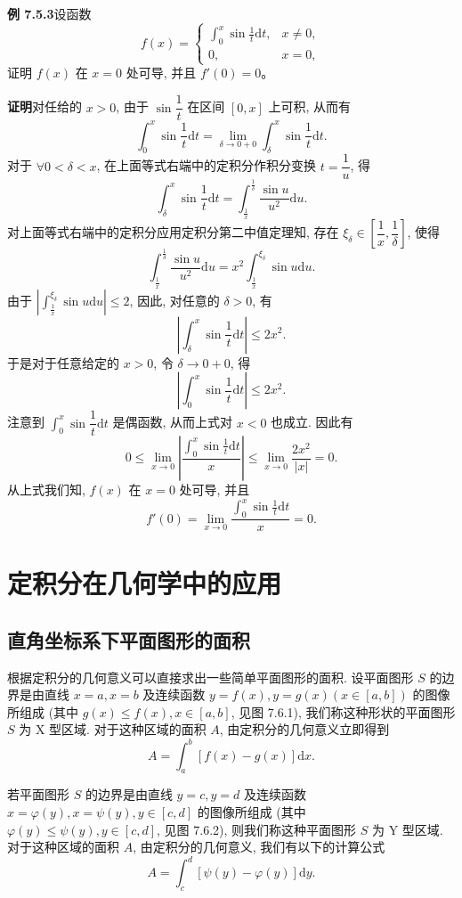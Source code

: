 \documentclass[UTF8, 12pt, fontset=fandol, oneside]{ctexart}
\begin{document}
\noindent\textbf{例 7.5.3}\quad 设函数
\[
  f(x)=
  \begin{cases}
    \displaystyle\int_0^x \sin\frac{1}{t}\mathrm dt, & x\neq0,\\
    0, & x=0,
  \end{cases}
\]
证明 $f(x)$ 在 $x=0$ 处可导, 并且 $f'(0)=0$。

\noindent\textbf{证明}\quad 对任给的 $x>0$, 由于 $\sin\dfrac{1}{t}$ 在区间 $[0,x]$ 上可积, 从而有
\[
  \int_0^x \sin\frac{1}{t}\mathrm dt=\lim_{\delta\to0+0}\int_\delta^x \sin\frac{1}{t}\mathrm dt.
\]
对于 $\forall 0<\delta<x$, 在上面等式右端中的定积分作积分变换 $t=\dfrac{1}{u}$, 得
\[
  \int_\delta^x \sin\frac{1}{t}\mathrm dt
  =\int_{\frac{1}{x}}^{\frac{1}{\delta}}\frac{\sin u}{u^2}\mathrm du.
\]
对上面等式右端中的定积分应用定积分第二中值定理知, 存在 $\xi_\delta\in\left[\dfrac{1}{x},\dfrac{1}{\delta}\right]$, 使得
\[
  \int_{\frac{1}{x}}^{\frac{1}{\delta}}\frac{\sin u}{u^2}\mathrm du
  =x^2\int_{\frac{1}{x}}^{\xi_\delta}\sin u\mathrm du.
\]
由于 $\left|\int_{\frac{1}{x}}^{\xi_\delta}\sin u\mathrm du\right|\leq2$, 因此, 对任意的 $\delta>0$, 有
\[
  \left|\int_\delta^x \sin\frac{1}{t}\mathrm dt\right|\leq2x^2.
\]
于是对于任意给定的 $x>0$, 令 $\delta\to0+0$, 得
\[
  \left|\int_0^x \sin\frac{1}{t}\mathrm dt\right|\leq2x^2.
\]
注意到 $\int_0^x\sin\dfrac{1}{t}\mathrm dt$ 是偶函数, 从而上式对 $x<0$ 也成立. 因此有
\[
  0\leq\lim_{x\to0}\left|\frac{\int_0^x\sin\frac{1}{t}\mathrm dt}{x}\right|
  \leq\lim_{x\to0}\frac{2x^2}{|x|}=0.
\]
从上式我们知, $f(x)$ 在 $x=0$ 处可导, 并且
\[
  f'(0)=\lim_{x\to0}\frac{\int_0^x\sin\frac{1}{t}\mathrm dt}{x}=0.
\]

\section{定积分在几何学中的应用}

\subsection{直角坐标系下平面图形的面积}

根据定积分的几何意义可以直接求出一些简单平面图形的面积. 设平面图形 $S$ 的边界是由直线 $x=a,x=b$ 及连续函数 $y=f(x),y=g(x)(x\in[a,b])$ 的图像所组成 (其中 $g(x)\leq f(x),x\in[a,b]$, 见图 7.6.1), 我们称这种形状的平面图形 $S$ 为 X 型区域. 对于这种区域的面积 $A$, 由定积分的几何意义立即得到
\[
  A=\int_a^b [f(x)-g(x)]\mathrm dx.
\]

若平面图形 $S$ 的边界是由直线 $y=c,y=d$ 及连续函数 $x=\varphi(y),x=\psi(y),y\in[c,d]$ 的图像所组成 (其中 $\varphi(y)\leq\psi(y),y\in[c,d]$, 见图 7.6.2), 则我们称这种平面图形 $S$ 为 Y 型区域. 对于这种区域的面积 $A$, 由定积分的几何意义, 我们有以下的计算公式
\[
  A=\int_c^d [\psi(y)-\varphi(y)]\mathrm dy.
\]
\end{document}
